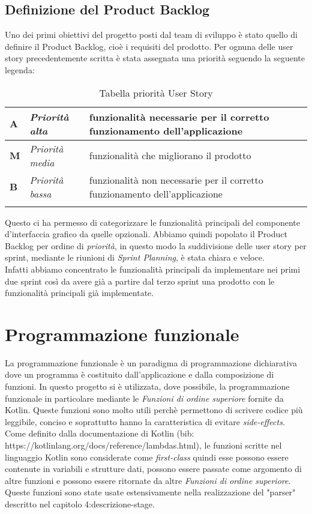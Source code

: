 \subsection{Definizione del Product Backlog}
Uno dei primi obiettivi del progetto posti dal team di sviluppo è stato quello di definire il Product Backlog, cioè i requisiti del prodotto. Per ognuna delle user story precedentemente scritta è stata assegnata una priorità seguendo la seguente legenda:
\begin{longtable} {
		|>{\centering}p{10mm}| 
		|>{}p{25mm}|
		|>{}p{85mm}|
		>{}p{0mm}}
	\hline
	\textbf{A} & \textit{Priorità alta}  & funzionalità necessarie per il corretto funzionamento dell'applicazione \\ \hline
	\textbf{M} & \textit{Priorità media} & funzionalità che migliorano il prodotto \\ \hline
	\textbf{B} & \textit{Priorità bassa} & funzionalità non necessarie per il corretto funzionamento dell'applicazione \\ \hline
	\hline
	\caption{Tabella priorità User Story}
\end{longtable}
\noindent
Questo ci ha permesso di categorizzare le funzionalità principali del componente d'interfaccia grafico da quelle opzionali. Abbiamo quindi popolato il Product Backlog per ordine di \textit{priorità}, in questo modo la suddivisione delle user story per sprint, mediante le riunioni di \textit{Sprint Planning}, è stata chiara e veloce. \\
Infatti abbiamo concentrato le funzionalità principali da implementare nei primi due sprint così da avere già a partire dal terzo sprint una prodotto con le funzionalità principali già implementate.

\section{Programmazione funzionale}
La programmazione funzionale è un paradigma di programmazione dichiarativa dove un programma è costituito dall'applicazione e dalla composizione di funzioni. In questo progetto si è utilizzata, dove possibile, la programmazione funzionale in particolare mediante le \emph{Funzioni di ordine superiore} fornite da Kotlin. Queste funzioni sono molto utili perchè permettono di scrivere codice più leggibile, conciso e soprattutto hanno la caratteristica di evitare \emph{side-effects}. Come definito dalla documentazione di Kotlin (bib: https://kotlinlang.org/docs/reference/lambdas.html), le funzioni scritte nel linguaggio Kotlin sono considerate come \emph{first-class} quindi esse possono essere contenute in variabili e strutture dati, possono essere passate come argomento di altre funzioni e possono essere ritornate da altre \emph{Funzioni di ordine superiore}. Queste funzioni sono state usate estensivamente nella realizzazione del "parser" descritto nel capitolo 4:descrizione-stage.

